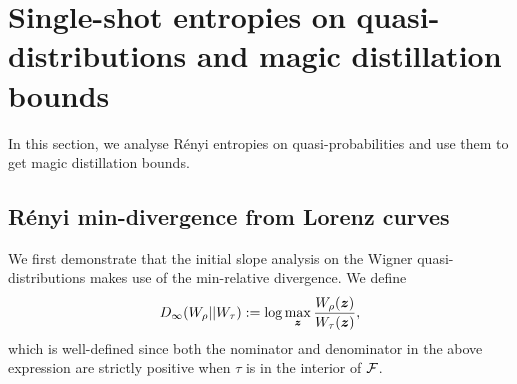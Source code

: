 \documentclass[pra,
aps,
twocolumn,
superscriptaddress,
groupedaddress,
nofootinbib,
reprint
]{revtex4-1}
\begin{document}
\section{Single-shot entropies on quasi-distributions and magic distillation bounds}\label{app:single-shot}

In this section, we analyse R\'{e}nyi entropies on quasi-probabilities and use them to get magic distillation bounds.

\subsection{R\'{e}nyi min-divergence from Lorenz curves}
We first demonstrate that the initial slope analysis on the Wigner quasi-distributions makes use of the min-relative divergence. We define 
\begin{equation}
	D_\infty(W_\rho || W_\tau) := \log  \max_{\bm{z}} \frac{W_\rho(\bm{z})}{W_\tau(\bm{z})},
\end{equation}
which is well-defined since both the nominator and denominator in the above expression are strictly positive when $\tau$ is in the interior of ${\mathcal F}$.
\end{document}
